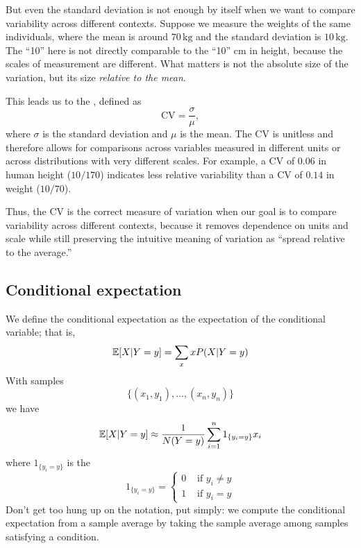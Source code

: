 But even the standard deviation is not enough by itself when we want to compare variability across different contexts. Suppose we measure the weights of the same individuals, where the mean is around $70 \,\text{kg}$ and the standard deviation is $10 \,\text{kg}$. The ``10'' here is not directly comparable to the ``10'' cm in height, because the scales of measurement are different. What matters is not the absolute size of the variation, but its size \emph{relative to the mean}.  

This leads us to the , defined as 
\begin{equation}
\text{CV} = \frac{\sigma}{\mu},
\end{equation}
where $\sigma$ is the standard deviation and $\mu$ is the mean. The CV is unitless and therefore allows for comparisons across variables measured in different units or across distributions with very different scales. For example, a CV of $0.06$ in human height ($10/170$) indicates less relative variability than a CV of $0.14$ in weight ($10/70$).  

Thus, the CV is the correct measure of variation when our goal is to compare variability across different contexts, because it removes dependence on units and scale while still preserving the intuitive meaning of variation as ``spread relative to the average.''  





\subsection{Conditional expectation}

 We define the conditional expectation  \cite[Definition 3.5.1]{evans} as the expectation of the conditional variable; that is, 
\begin{equation*}
\mathbb E[X|Y=y] = \sum_{x} xP(X|Y=y)
\end{equation*}
With samples
\begin{equation*}
\{(x_1,y_1),\dots,(x_n,y_n)\}
\end{equation*}
we have 
 \begin{equation*}
 \mathbb E[X|Y=y] \approx  \frac{1}{N(Y=y)}\sum_{i=1}^n1_{\{y_i = y\}}x_i
 \end{equation*}
 where $1_{\{y_i = y\}}$ is the 
 \begin{equation*}
 1_{\{y_i = y\}} = \left\{ \begin{array}{cc}
 0 & \text{ if } y_i\ne y\\
  1 & \text{ if } y_i=y
  \end{array}\right.
 \end{equation*}
Don't get too hung up on the notation, put simply: we compute the conditional expectation from a sample average by taking the sample average among samples satisfying a condition. 

